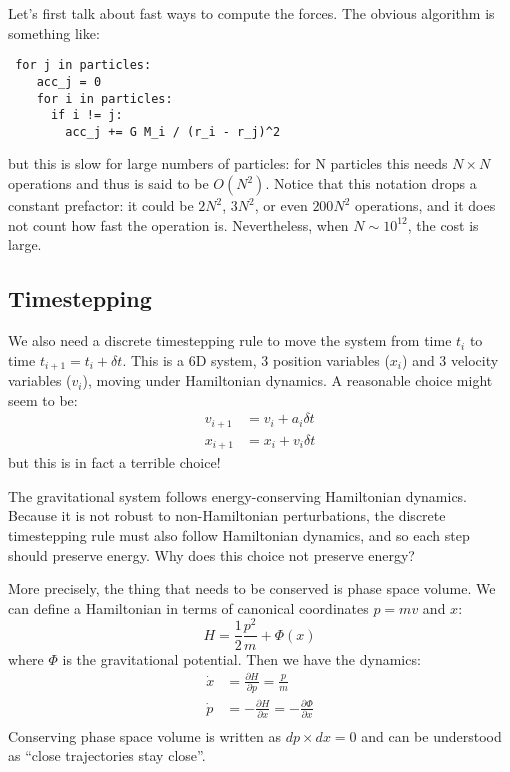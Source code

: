 \documentclass[12pt]{article}
\begin{document}
Let's first talk about fast ways to compute the forces. The obvious algorithm is something like:
\begin{verbatim}
 for j in particles:
    acc_j = 0
    for i in particles:
      if i != j:
        acc_j += G M_i / (r_i - r_j)^2
\end{verbatim}
but this is slow for large numbers of particles: for N particles this needs $N \times N$ operations and thus is said to be $O(N^2)$. Notice that this notation drops a constant prefactor: it could be $2 N^2$, $3 N^2$, or even $200 N^2$ operations, and it does not count how fast the operation is. Nevertheless, when $N \sim 10^{12}$, the cost is large.

\subsection{Timestepping}

We also need a discrete timestepping rule to move the system from time $t_i$ to time $t_{i+1} = t_i + \delta t$. This is a 6D system, 3 position variables ($x_i$) and 3 velocity variables ($v_i$), moving under Hamiltonian dynamics. A reasonable choice might seem to be:
\begin{align}
v_{i+1} &= v_i + a_i \delta t \\
x_{i+1} &= x_i + v_i \delta t
\label{eq:euler}
\end{align}
but this is in fact a terrible choice!

The gravitational system follows energy-conserving Hamiltonian dynamics. Because it is not robust to non-Hamiltonian perturbations, the discrete timestepping rule must also follow Hamiltonian dynamics, and so each step should preserve energy. Why does this choice not preserve energy?

More precisely, the thing that needs to be conserved is phase space volume. We can define a Hamiltonian in terms of canonical coordinates $p = m v$ and $x$:
\begin{equation}
 H = \frac{1}{2} \frac{p^2}{m} + \Phi (x)
\end{equation}
where $\Phi$ is the gravitational potential.
Then we have the dynamics:
\begin{align}
 \dot{x} &= \frac{\partial H}{\partial p} = \frac{p}{m}\\
 \dot{p} &= - \frac{\partial H}{\partial x} = - \frac{\partial \Phi}{\partial x}\\
\end{align}
Conserving phase space volume is written as $dp \times dx = 0$ and can be understood as ``close trajectories stay close''.
\end{document}
